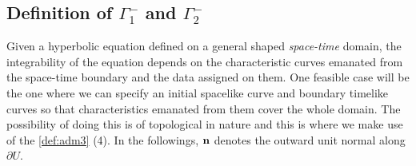 \documentclass[11pt]{amsart}
\theoremstyle{plain}
\theoremstyle{remark}
\numberwithin{equation}{section}
\numberwithin{Thm}{section}
\def\N{{\mathbf N}}
\def\n{{\bf n}}
\begin{document}
% 
% 
% 

\subsection{Definition of $\Gamma^-_1$ and $\Gamma^-_2$}

Given a hyperbolic equation defined on a general shaped {\it space-time} domain, the integrability of the equation depends on the characteristic curves emanated from the space-time boundary and the data assigned on them. One feasible case will be the one where we can specify an initial spacelike curve and boundary timelike curves so that characteristics emanated from them cover the whole domain. The possibility of doing this is of topological in nature and this is where we make use of the \ref{def:adm3} (4). In the followings, $\n$ denotes the outward unit normal along $\partial U$.
\end{document}
